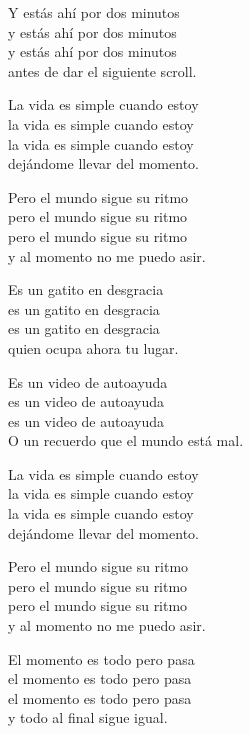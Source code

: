\begin{lyrics}
Y estás ahí por dos minutos\\
y estás ahí por dos minutos\\
y estás ahí por dos minutos\\
antes de dar el siguiente scroll.

La vida es simple cuando estoy\\
la vida es simple cuando estoy\\
la vida es simple cuando estoy\\
dejándome llevar del momento.

Pero el mundo sigue su ritmo\\
pero el mundo sigue su ritmo\\
pero el mundo sigue su ritmo\\
y al momento no me puedo asir.

Es un gatito en desgracia\\
es un gatito en desgracia\\
es un gatito en desgracia\\
quien ocupa ahora tu lugar.

Es un video de autoayuda\\
es un video de autoayuda\\
es un video de autoayuda\\
O un recuerdo que el mundo está mal.

La vida es simple cuando estoy\\
la vida es simple cuando estoy\\
la vida es simple cuando estoy\\
dejándome llevar del momento.

Pero el mundo sigue su ritmo\\
pero el mundo sigue su ritmo\\
pero el mundo sigue su ritmo\\
y al momento no me puedo asir.

El momento es todo pero pasa\\
el momento es todo pero pasa\\
el momento es todo pero pasa\\
y todo al final sigue igual.
\end{lyrics}

